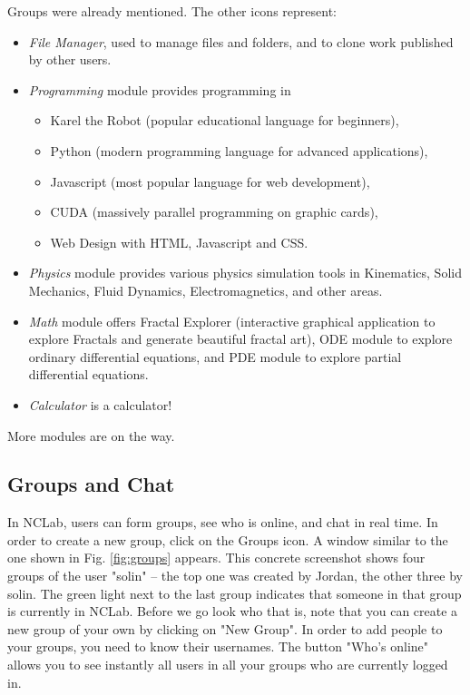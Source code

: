 \documentclass[article,A4,12pt]{llncs}
\begin{document}
\noindent
Groups were already mentioned. The other icons
represent:

\begin{itemize}
\item {\em File Manager}, used to manage files and folders, and to clone work published by other users.
\item {\em Programming} module provides programming in 
      \begin{itemize}
      \item Karel the Robot (popular educational language for beginners),
      \item Python (modern programming language for advanced applications), 
      \item Javascript 
      (most popular language for web development), 
      \item CUDA (massively parallel programming on graphic cards),
      \item Web Design with HTML, Javascript and CSS. 
      \end{itemize}
\item {\em Physics} module provides various physics simulation tools in Kinematics,
      Solid Mechanics, Fluid Dynamics, Electromagnetics, and other areas. 
\item {\em Math} module offers Fractal Explorer (interactive graphical application 
      to explore Fractals and generate beautiful fractal art), ODE module to explore 
      ordinary differential equations, and PDE module to explore partial differential 
      equations. 
\item {\em Calculator} is a calculator! 
\end{itemize}
More modules are on the way. 

\subsection{Groups and Chat}

In NCLab, users can form groups, see who is online, and chat in real time. In order to 
create a new group, click on the Groups icon. A window similar to the one shown 
in Fig. \ref{fig:groups} appears. This concrete screenshot shows four groups of the 
user "solin" -- the top one was created by Jordan, the other three by solin. The 
green light next to the last group indicates that someone in that group
is currently in NCLab. Before we go look who that is, note that you can create a
new group of your own by clicking on "New Group". In order to add people to your groups,
you need to know their usernames. The button "Who's online" allows you to see instantly 
all users in all your groups who are currently logged in. 
\end{document}
